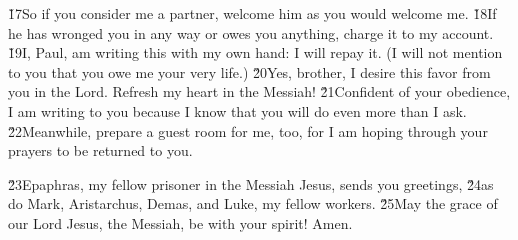 \v{17}So if you consider me a partner, welcome him as you would welcome me. \v{18}If he has wronged you in any way or owes you anything, charge it to my account. \v{19}I, Paul, am writing this with my own hand: I will repay it. (I will not mention to you that you owe me your very life.) \v{20}Yes, brother, I desire this favor from you in the Lord. Refresh my heart in the Messiah! \v{21}Confident of your obedience, I am writing to you because I know that you will do even more than I ask. \v{22}Meanwhile, prepare a guest room for me, too, for I am hoping through your prayers to be returned to you.

\v{23}Epaphras, my fellow prisoner in the Messiah Jesus, sends you greetings, \v{24}as do Mark, Aristarchus, Demas, and Luke, my fellow workers. \v{25}May the grace of our Lord Jesus, the Messiah, be with your spirit! Amen.
